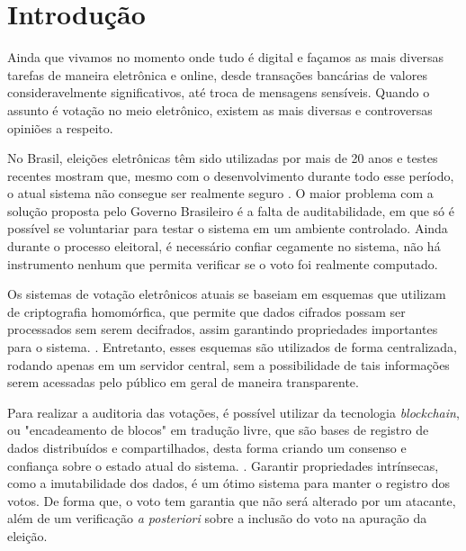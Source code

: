 \documentclass{ufsctex/ufsctex}
\begin{document}
\capa{}

\pretextuais{}

\listadefiguras{}

\listadetabelas{}

\listadeabreviaturas{}

\sumario{}

\chapter{Introdução} Ainda que vivamos no momento onde tudo é digital e façamos
as mais diversas tarefas de maneira eletrônica e online, desde transações
bancárias de valores consideravelmente significativos, até troca de mensagens
sensíveis. Quando o assunto é votação no meio eletrônico, existem as mais
diversas e controversas opiniões a respeito. 

No Brasil, eleições eletrônicas têm sido utilizadas por mais de 20
anos \cite{AranhaKMS14} e testes recentes mostram que, mesmo com o
desenvolvimento durante todo esse período, o atual sistema não consegue ser
realmente seguro \cite{aranha}. O maior problema com a solução proposta pelo
Governo Brasileiro é a falta de auditabilidade, em que só é possível se
voluntariar para testar o sistema em um ambiente controlado. Ainda durante o
processo eleitoral, é necessário confiar cegamente no sistema, não há
instrumento nenhum que permita verificar se o voto foi realmente computado.

Os sistemas de votação eletrônicos atuais se baseiam em esquemas que utilizam de
criptografia homomórfica, que permite que dados cifrados possam ser processados
sem serem decifrados, assim garantindo propriedades importantes para o
sistema. \cite{springer}. Entretanto, esses esquemas são utilizados de forma
centralizada, rodando apenas em um servidor central, sem a possibilidade de tais
informações serem acessadas pelo público em geral de maneira transparente.

Para realizar a auditoria das votações, é possível utilizar da tecnologia
\textit{blockchain}, ou "encadeamento de blocos" em tradução livre, que são
bases de registro de dados distribuídos e compartilhados, desta forma criando
um consenso e confiança sobre o estado atual do sistema.
\cite{nakamoto2012bitcoin}. Garantir propriedades intrínsecas, como a
imutabilidade dos dados, é um ótimo sistema para manter o registro dos votos.
De forma que, o voto tem garantia que não será alterado por um atacante, além
de um verificação \textit{a posteriori} sobre a inclusão do voto na apuração da
eleição.
\end{document}
